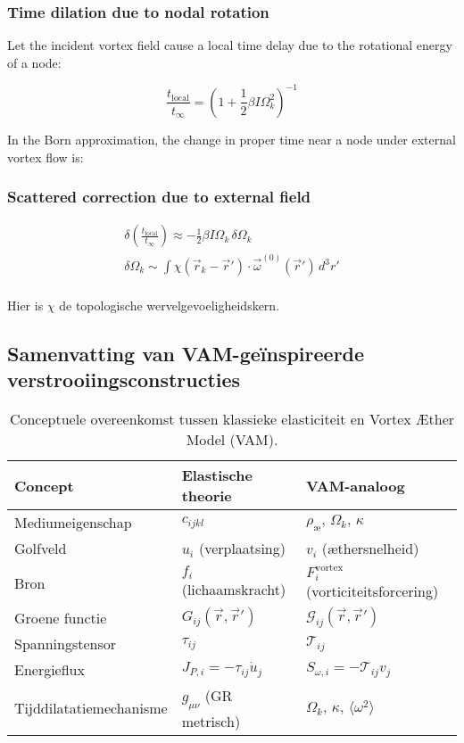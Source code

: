 \subsubsection*{Time dilation due to nodal rotation}

Let the incident vortex field cause a local time delay due to the rotational energy of a node:

\[
    \frac{t_\text{local}}{t_{\infty}} = \left(1 + \frac{1}{2} \beta I \Omega_k^2 \right)^{-1}
\]

In the Born approximation, the change in proper time near a node under external vortex flow is:

\subsubsection*{Scattered correction due to external field}

\begin{gather*}
    \delta \left( \frac{t_\text{local}}{t_{\infty}} \right) \approx - \frac{1}{2} \beta I \Omega_k \, \delta \Omega_k\\
    \delta \Omega_k \sim \int \chi(\vec{r}_k - \vec{r}') \cdot \vec{\omega}^{(0)}(\vec{r}') \, d^3r'\\
\end{gather*}


Hier is \(\chi\) de topologische wervelgevoeligheidskern.

\subsection{Samenvatting van VAM-geïnspireerde verstrooiingsconstructies}

\begin{table}[htbp]
    \centering
    \begin{tabular}{lll}
        \toprule
        \textbf{Concept} & \textbf{Elastische theorie} & \textbf{VAM-analoog} \\
        \midrule
        Mediumeigenschap & \( c_{ijkl} \) & \( \rho_\text{\ae},\, \Omega_k,\, \kappa \) \\
        Golfveld & \( u_i \) (verplaatsing) & \( v_i \) (æthersnelheid) \\
        Bron & \( f_i \) (lichaamskracht) & \( F_i^\text{vortex} \) (vorticiteitsforcering) \\
        Groene functie & \( G_{ij}(\vec{r}, \vec{r}') \) & \( \mathcal{G}_{ij}(\vec{r}, \vec{r}') \) \\
        Spanningstensor & \( \tau_{ij} \) & \( \mathcal{T}_{ij} \) \\
        Energieflux & \( J_{P,i} = -\tau_{ij} \dot{u}_j \) & \( S_{\omega,i} = -\mathcal{T}_{ij} v_j \) \\
        Tijddilatatiemechanisme & \( g_{\mu\nu} \) (GR metrisch) & \( \Omega_k,\, \kappa,\, \langle \omega^2 \rangle \) \\
        \bottomrule
    \end{tabular}
    \caption{Conceptuele overeenkomst tussen klassieke elasticiteit en Vortex Æther Model (VAM).}
    \label{tab:elastic-vam-analogy}
\end{table}

